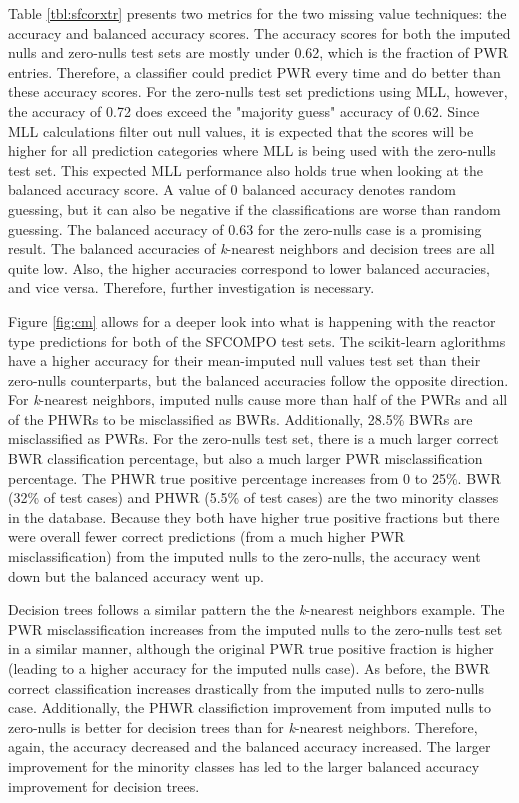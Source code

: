 Table \ref{tbl:sfcorxtr} presents two metrics for the two missing value
techniques: the accuracy and balanced accuracy scores. The accuracy scores for
both the imputed nulls and zero-nulls test sets are mostly under 0.62, which is
the fraction of \gls{PWR} entries.  Therefore, a classifier could predict
\gls{PWR} every time and do better than these accuracy scores.  For the
zero-nulls test set predictions using \gls{MLL}, however, the accuracy of 0.72
does exceed the "majority guess" accuracy of 0.62.  Since \gls{MLL}
calculations filter out null values, it is expected that the scores will be
higher for all prediction categories where \gls{MLL} is being used with the
zero-nulls test set. This expected \gls{MLL} performance also holds true when
looking at the balanced accuracy score.  A value of 0 balanced accuracy denotes
random guessing, but it can also be negative if the classifications are worse
than random guessing. The balanced accuracy of 0.63 for the zero-nulls case is
a promising result. The balanced accuracies of \textit{k}-nearest neighbors and
decision trees are all quite low. Also, the higher accuracies correspond to lower
balanced accuracies, and vice versa. Therefore, further investigation is
necessary.

Figure \ref{fig:cm} allows for a deeper look into what is happening with the
reactor type predictions for both of the \gls{SFCOMPO} test sets.  The
scikit-learn aglorithms have a higher accuracy for their mean-imputed null
values test set than their zero-nulls counterparts, but the balanced accuracies
follow the opposite direction. For \textit{k}-nearest neighbors, imputed nulls
cause more than half of the \gls{PWR}s and all of the \gls{PHWR}s to be
misclassified as \gls{BWR}s. Additionally, 28.5\% \gls{BWR}s are misclassified
as \gls{PWR}s.  For the zero-nulls test set, there is a much larger correct
\gls{BWR} classification percentage, but also a much larger \gls{PWR}
misclassification percentage. The \gls{PHWR} true positive percentage increases
from 0 to 25\%. \Gls{BWR} (32\% of test cases) and \gls{PHWR} (5.5\% of test
cases) are the two minority classes in the database.  Because they both have
higher true positive fractions but there were overall fewer correct predictions
(from a much higher \gls{PWR} misclassification) from the imputed nulls to the
zero-nulls, the accuracy went down but the balanced accuracy went up.

Decision trees follows a similar pattern the the \textit{k}-nearest neighbors
example.  The \gls{PWR} misclassification increases from the imputed nulls to
the zero-nulls test set in a similar manner, although the original \gls{PWR}
true positive fraction is higher (leading to a higher accuracy for the imputed
nulls case).  As before, the \gls{BWR} correct classification increases
drastically from the imputed nulls to zero-nulls case.  Additionally, the
\gls{PHWR} classifiction improvement from imputed nulls to zero-nulls is better
for decision trees than for \textit{k}-nearest neighbors.  Therefore, again,
the accuracy decreased and the balanced accuracy increased. The larger
improvement for the minority classes has led to the larger balanced accuracy
improvement for decision trees.


